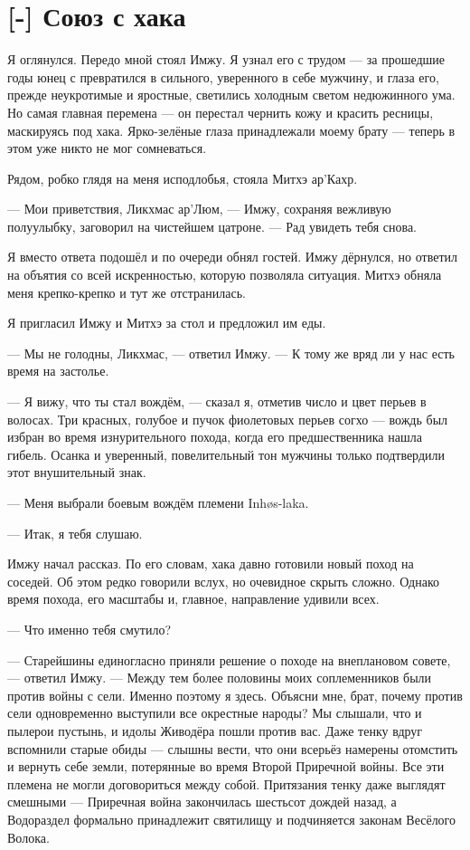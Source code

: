 \section{[-] Союз с хака}

\textspace

Я оглянулся.
Передо мной стоял Имжу.
Я узнал его с трудом --- за прошедшие годы юнец с превратился в сильного, уверенного в себе мужчину, и глаза его, прежде неукротимые и яростные, светились холодным светом недюжинного ума.
Но самая главная перемена --- он перестал чернить кожу и красить ресницы, маскируясь под хака.
Ярко-зелёные глаза принадлежали моему брату --- теперь в этом уже никто не мог сомневаться.

Рядом, робко глядя на меня исподлобья, стояла Митхэ ар’Кахр.

--- Мои приветствия, Ликхмас ар’Люм, --- Имжу, сохраняя вежливую полуулыбку, заговорил на чистейшем цатроне.
--- Рад увидеть тебя снова.

Я вместо ответа подошёл и по очереди обнял гостей.
Имжу дёрнулся, но ответил на объятия со всей искренностью, которую позволяла ситуация.
Митхэ обняла меня крепко-крепко и тут же отстранилась.

Я пригласил Имжу и Митхэ за стол и предложил им еды.

--- Мы не голодны, Ликхмас, --- ответил Имжу.
--- К тому же вряд ли у нас есть время на застолье.

--- Я вижу, что ты стал вождём, --- сказал я, отметив число и цвет перьев в волосах.
Три красных, голубое и пучок фиолетовых перьев согхо --- вождь был избран во время изнурительного похода, когда его предшественника нашла гибель.
Осанка и уверенный, повелительный тон мужчины только подтвердили этот внушительный знак.

--- Меня выбрали боевым вождём племени Inh\o s-laka\FM.

--- Итак, я тебя слушаю.

Имжу начал рассказ.
По его словам, хака давно готовили новый поход на соседей.
Об этом редко говорили вслух, но очевидное скрыть сложно.
Однако время похода, его масштабы и, главное, направление удивили всех.

--- Что именно тебя смутило?

--- Старейшины единогласно приняли решение о походе на внеплановом совете, --- ответил Имжу.
--- Между тем более половины моих соплеменников были против войны с сели.
Именно поэтому я здесь.
Объясни мне, брат, почему против сели одновременно выступили все окрестные народы?
Мы слышали, что и пылерои пустынь, и идолы Живодёра пошли против вас.
Даже тенку вдруг вспомнили старые обиды --- слышны вести, что они всерьёз намерены отомстить и вернуть себе земли, потерянные во время Второй Приречной войны.
Все эти племена не могли договориться между собой.
Притязания тенку даже выглядят смешными --- Приречная война закончилась шестьсот дождей назад, а Водораздел формально принадлежит святилищу и подчиняется законам Весёлого Волока.


